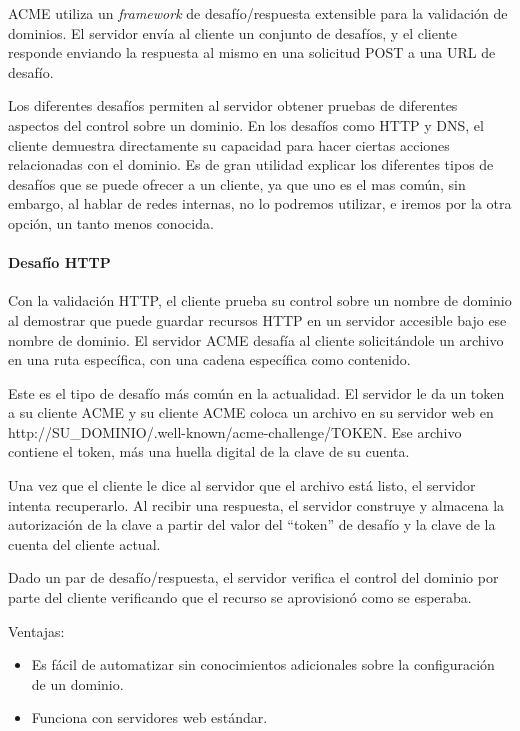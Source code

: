 ACME utiliza un \emph{framework} de desafío/respuesta extensible para la validación 
de dominios. El servidor envía al cliente un conjunto de desafíos, y el cliente 
responde enviando la respuesta al mismo en una solicitud POST a una URL de desafío.

Los diferentes desafíos permiten al servidor obtener pruebas de diferentes 
aspectos del control sobre un dominio. En los desafíos como HTTP y 
DNS, el cliente demuestra directamente su capacidad para hacer ciertas 
acciones relacionadas con el dominio. Es de gran utilidad explicar los 
diferentes tipos de desafíos que se puede ofrecer a un cliente, ya que uno 
es el mas común, sin embargo, al hablar de redes internas, no lo podremos 
utilizar, e iremos por la otra opción, un tanto menos conocida.


\paragraph*{Desafío HTTP}

Con la validación HTTP, el cliente prueba su control sobre un nombre de dominio al 
demostrar que puede guardar recursos HTTP en un servidor accesible bajo ese nombre 
de dominio. El servidor ACME desafía al cliente solicitándole un archivo en una ruta 
específica, con una cadena específica como contenido.

Este es el tipo de desafío más común en la actualidad. El servidor le da un token 
a su cliente ACME y su cliente ACME coloca un archivo en su servidor web 
en {http://\<SU\_DOMINIO\>/.well-known/acme-challenge/\<TOKEN\>}. Ese archivo contiene 
el token, más una huella digital de la clave de su cuenta.

Una vez que el cliente le dice al servidor que el archivo está listo, el servidor 
intenta recuperarlo. Al recibir una respuesta, el servidor construye y almacena la 
autorización de la clave a partir del valor del “token” de desafío y la clave de 
la cuenta del cliente actual.

Dado un par de desafío/respuesta, el servidor verifica el control del dominio por 
parte del cliente verificando que el recurso se aprovisionó como se esperaba.

Ventajas:
\begin{itemize}
   \setlength\itemsep{-0.6em}
   \item Es fácil de automatizar sin conocimientos adicionales sobre la configuración de un dominio.
   \item Funciona con servidores web estándar.
\end{itemize}

